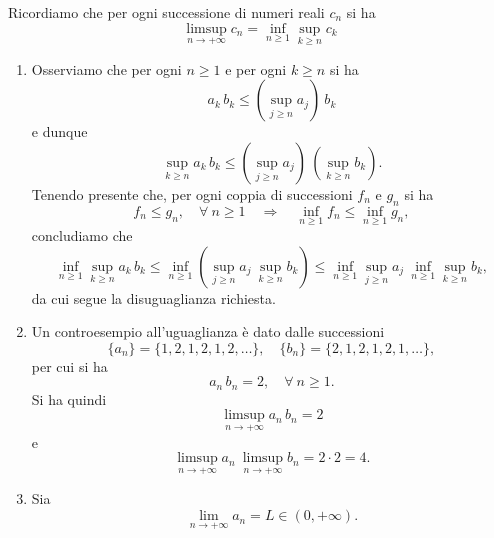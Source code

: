 \begin{demonstration}
Ricordiamo che per ogni successione di numeri reali $c_n$ si ha
\begin{equation*}
	\limsup_{n\to +\infty} c_n =\inf_{n\geq 1} \sup_{k\geq n} c_k
\end{equation*}
\begin{enumerate}
	\item Osserviamo che per ogni $n\geq 1$ e per ogni $k\geq n$ si ha
	\begin{equation*}
		a_k\, b_k\leq \left(\sup_{j\geq n} a_j \right)\ b_k
	\end{equation*}
	e dunque
	\begin{equation*}
		\sup_{k\geq n} a_k\, b_k\leq \left(\sup_{j\geq n} a_j \right)\ \left(\sup_{k\geq n} b_k \right).
	\end{equation*}
	Tenendo presente che, per ogni coppia di successioni $f_n$ e $g_n$ si ha
	\begin{equation*}
		f_n\leq g_n,\quad \forall \ n\geq 1 \quad \Longrightarrow \quad \inf_{n\geq 1} f_n\leq \inf_{n\geq 1} g_n,
	\end{equation*}
	concludiamo che
	\begin{equation*}
		\inf_{n\geq 1} \sup_{k\geq n} a_k\, b_k\leq \inf_{n\geq 1}\left(\sup_{j\geq n} a_j \ \sup_{k\geq n} b_k \right)\leq \inf_{n\geq 1} \sup_{j\geq n} a_j\ \inf_{n\geq 1} \sup_{k\geq n} b_k,
	\end{equation*} 
	da cui segue la disuguaglianza richiesta.
	\item Un controesempio all'uguaglianza è dato dalle successioni
	\begin{equation*}
		\{a_n\}=\{1, 2, 1, 2, 1, 2, \ldots \},\quad \{ b_n\} = \{2, 1, 2, 1, 2, 1,\ldots \},
	\end{equation*}
	per cui si ha
	\begin{equation*}
		a_n\, b_n=2,\quad \forall \ n\geq 1.
	\end{equation*}
	Si ha quindi
	\begin{equation*}
		\limsup_{n\to +\infty} a_n \, b_n = 2
	\end{equation*}
	e
	\begin{equation*}
		\limsup_{n\to +\infty} a_n \ \limsup_{n\to +\infty} b_n = 2\cdot 2=4.
	\end{equation*}
	\item Sia
	\begin{equation*}
		\lim_{n\to +\infty} a_n =L \in (0,+\infty).
	\end{equation*}

\end{enumerate}
\end{demonstration}
